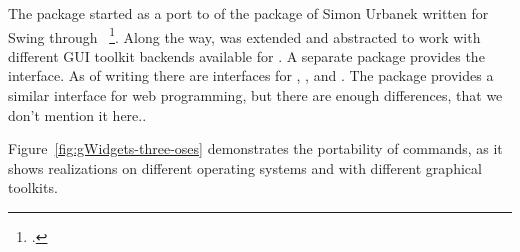 
The  package started as a port to  of the
 package of Simon Urbanek written for Swing through
~\footcite{iWidgets}. Along the way,  was
extended and abstracted to work with different GUI toolkit backends
available for \R. A separate package provides the interface. As of
writing there are interfaces for , , and
. The  package provides a similar
interface for web programming, but there are enough differences, that
we don't mention it here..

Figure~\ref{fig:gWidgets-three-oses} demonstrates the portability of
 commands, as it shows realizations on different
operating systems and with different graphical toolkits.

